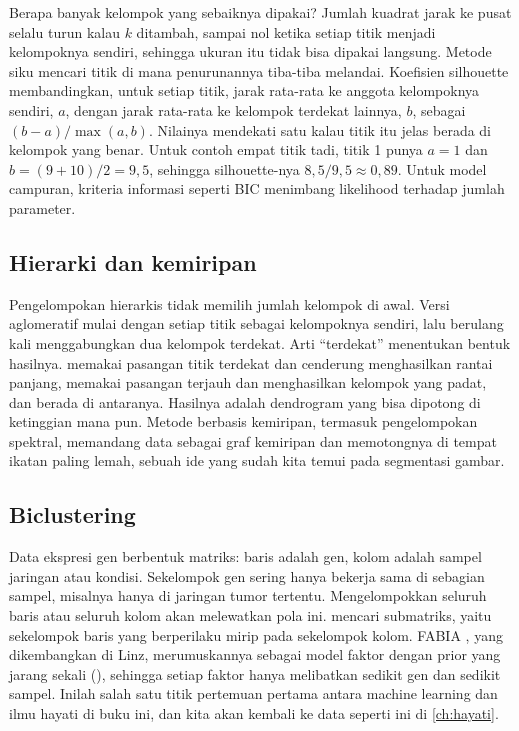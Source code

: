 Berapa banyak kelompok yang sebaiknya dipakai? Jumlah kuadrat jarak ke pusat selalu turun kalau $k$ ditambah, sampai
nol ketika setiap titik menjadi kelompoknya sendiri, sehingga ukuran itu tidak bisa dipakai langsung. Metode siku mencari
titik di mana penurunannya tiba-tiba melandai. Koefisien silhouette membandingkan, untuk setiap titik, jarak rata-rata
ke anggota kelompoknya sendiri, $a$, dengan jarak rata-rata ke kelompok terdekat lainnya, $b$, sebagai $(b-a)/\max(a,b)$.
Nilainya mendekati satu kalau titik itu jelas berada di kelompok yang benar. Untuk contoh empat titik tadi, titik 1 punya
$a=1$ dan $b=(9+10)/2=9{,}5$, sehingga silhouette-nya $8{,}5/9{,}5\approx0{,}89$. Untuk model campuran, kriteria informasi
seperti BIC menimbang likelihood terhadap jumlah parameter.

\subsection{Hierarki dan kemiripan}

Pengelompokan hierarkis tidak memilih jumlah kelompok di awal. Versi aglomeratif mulai dengan setiap
titik sebagai kelompoknya sendiri, lalu berulang kali menggabungkan dua kelompok terdekat. Arti
``terdekat'' menentukan bentuk hasilnya.  memakai pasangan titik terdekat dan
cenderung menghasilkan rantai panjang,  memakai pasangan terjauh dan
menghasilkan kelompok yang padat, dan  berada di antaranya. Hasilnya adalah
dendrogram yang bisa dipotong di ketinggian mana pun. Metode berbasis kemiripan, termasuk
pengelompokan spektral, memandang data sebagai graf kemiripan dan memotongnya di tempat ikatan
paling lemah, sebuah ide yang sudah kita temui pada segmentasi gambar.

\subsection{Biclustering}

Data ekspresi gen berbentuk matriks: baris adalah gen, kolom adalah sampel jaringan atau kondisi.
Sekelompok gen sering hanya bekerja sama di sebagian sampel, misalnya hanya di jaringan tumor
tertentu. Mengelompokkan seluruh baris atau seluruh kolom akan melewatkan pola ini.
 mencari submatriks, yaitu sekelompok baris yang berperilaku mirip pada
sekelompok kolom. FABIA \citep{hochreiter2010}, yang dikembangkan di Linz, merumuskannya sebagai
model faktor dengan prior yang jarang sekali (), sehingga setiap faktor hanya melibatkan
sedikit gen dan sedikit sampel. Inilah salah satu titik pertemuan pertama antara machine learning
dan ilmu hayati di buku ini, dan kita akan kembali ke data seperti ini di \cref{ch:hayati}.

